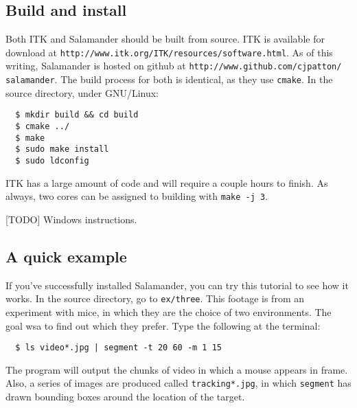 \documentclass[letter]{article}
\newcounter{foot}
\begin{document}
\subsection{Build and install}
Both ITK and Salamander should be built from source. ITK is available for download at 
\texttt{http://www.itk.org/ITK/resources/software.html}. As of this writing, Salamander 
is hosted on github at \texttt{http://www.github.com/cjpatton/ salamander}. The build 
process for both is identical, as they use \texttt{cmake}. In the source directory, 
under GNU/Linux: 
\begin{verbatim}
  $ mkdir build && cd build
  $ cmake ../ 
  $ make
  $ sudo make install 
  $ sudo ldconfig
\end{verbatim}
ITK has a large amount of code and will require a couple hours to finish. As always, 
two cores can be assigned to building with \texttt{make -j 3}. 

[TODO] Windows instructions.

\subsection{A quick example} 
If you've successfully installed Salamander, you can try this tutorial to see how it 
works. In the source directory, go to \texttt{ex/three}. This footage is from an 
experiment with mice, in which they are the choice of two environments. The goal 
wsa to find out which they prefer. Type the following at the terminal:
\begin{verbatim}
  $ ls video*.jpg | segment -t 20 60 -m 1 15 
\end{verbatim}
The program will output the chunks of video in which a mouse appears in frame. Also,
a series of images are produced called \texttt{tracking*.jpg}, in which \texttt{segment}
has drawn bounding boxes around the location of the target. 
\end{document}
